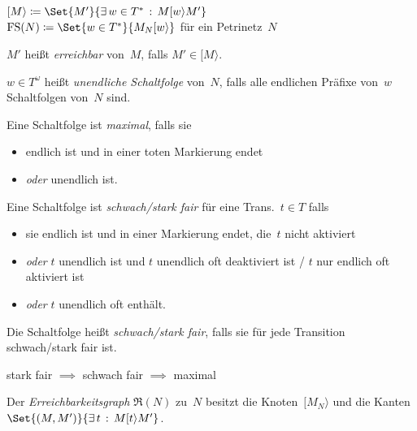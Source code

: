 \documentclass{cheat-sheet}
\newcommand{\activeTransition}[1]{[{#1}\rangle} %
\DeclareMathOperator{\FS}{FS} %
\newcommand{\ReachabilityGraph}{\mathfrak{R}} %
\begin{document}
\begin{nota}
  \begin{minipage}[t]{0.8 \linewidth}
    $\activeTransition{M} \coloneqq \Set{M'}{\ex{w \in T^{*}} M \activeTransition{w} M'}$ \\
    $\FS(N) \coloneqq \Set{w \in T^{*}}{M_N \activeTransition{w}}$ \enspace
    für ein Petrinetz~$N$
  \end{minipage}
\end{nota}

\begin{defn}
  $M'$ heißt \emph{erreichbar} von~$M$, falls $M' \in \activeTransition{M}$.
\end{defn}

\begin{defn}
  $w \in T^\omega$ heißt \emph{unendliche Schaltfolge} von~$N$, falls alle endlichen Präfixe von~$w$ Schaltfolgen von~$N$ sind.
\end{defn}

\begin{defn}
  Eine Schaltfolge ist \emph{maximal}, falls sie
  \begin{itemize}
    \item endlich ist und in einer toten Markierung endet
    \item \textit{oder} unendlich ist.
  \end{itemize}
  Eine Schaltfolge ist \emph{schwach/stark fair} für eine Trans.~$t \in T$ falls
  \begin{itemize}
    \item sie endlich ist und in einer Markierung endet, die~$t$ nicht aktiviert
    \item \textit{oder} $t$ unendlich ist und $t$ unendlich oft deaktiviert ist / $t$ nur endlich oft aktiviert ist
    \item \textit{oder} $t$ unendlich oft enthält.
  \end{itemize}
  Die Schaltfolge heißt \textit{schwach/stark fair}, falls sie für jede Transition schwach/stark fair ist.
\end{defn}

\begin{bem}
  stark fair $\implies$ schwach fair $\implies$ maximal
\end{bem}

\begin{defn}
  Der \emph{Erreichbarkeitsgraph} $\ReachabilityGraph(N)$ zu~$N$ besitzt die Knoten~$\activeTransition{M_N}$ und die Kanten $\Set{(M, M')}{\ex{t} M \activeTransition{t} M'}$.
\end{defn}
\end{document}
